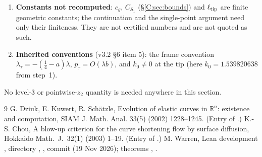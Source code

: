 \documentclass[11pt]{article}
\begin{document}
\begin{enumerate}[leftmargin=*]
\item \textbf{Constants not recomputed}: $c_g$, $C_{S_1}$ (\S\ref{C:sec:bounds}) and $\ell_{\rm tip}$ are finite geometric constants; the continuation and the single-point argument need only their finiteness. They are not certified numbers and are not quoted as such.
\item \textbf{Inherited conventions} (v3.2 \S6 item 5): the frame convention $\lambda_\tau=-(\frac14-a)\lambda$, $p_\tau=O(\lambda b)$, and $k_0\ne0$ at the tip (here $k_0=1.539820638$ from step~1).
\end{enumerate}
No level-3 or pointwise-$z_2$ quantity is needed anywhere in this section.

\ifdefined\stepmain\else
\begin{thebibliography}{9}
 G. Dziuk, E. Kuwert, R. Sch\"atzle, Evolution of elastic curves in $\mathbb R^n$: existence and computation, SIAM J. Math. Anal. 33(5) (2002) 1228--1245. (Entry  of .)
 K.-S. Chou, A blow-up criterion for the curve shortening flow by surface diffusion, Hokkaido Math.\ J.\ 32(1) (2003) 1--19. (Entry  of .)
 M. Warren, Lean development , directory , , commit  (19 Nov 2026); theorems , .
\end{thebibliography}
\end{document}
